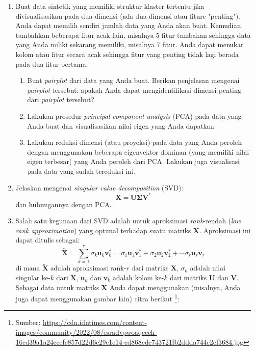 \documentclass[a4paper,11pt]{article} %
\begin{document}
\begin{enumerate}
%
%
\item Buat data sintetik yang memiliki struktur klaster tertentu
jika divisualisasikan pada dua dimensi (ada dua dimensi atau fiture "penting").
Anda dapat memilih sendiri jumlah data yang Anda akan buat.
Kemudian tambahkan beberapa fitur acak lain, misalnya 5 fitur tambahan sehingga
data yang Anda miliki sekarang memiliki, misalnya 7 fitur. Anda dapat menukar
kolom atau fitur secara acak sehingga fitur yang penting tidak lagi berada
pada dua fitur pertama.
  \begin{enumerate}
    \item Buat \textit{pairplot} dari data yang Anda buat. Berikan penjelasan
    mengenai \textit{pairplot} tersebut: apakah Anda dapat mengidentifikasi
    dimensi penting dari \textit{pairplot} tersebut?
    \item Lakukan prosedur \textit{principal component analysis} (PCA) pada
    data yang Anda buat dan visualisasikan nilai eigen yang Anda dapatkan
    \item Lakukan reduksi dimensi (atau proyeksi) pada data yang Anda peroleh
    dengan menggunakan beberapa eigenvektor dominan (yang memiliki
    nilai eigen terbesar) yang Anda peroleh dari PCA. Lakukan juga visualisasi
    pada data yang sudah tereduksi ini.
  \end{enumerate}
%
%
\item Jelaskan mengenai \textit{singular value decomposition} (SVD):
\begin{equation*}
\mathbf{X} = \mathbf{U}\mathbf{\Sigma}\mathbf{V}^{*}
\end{equation*}
dan hubungannya dengan PCA.
%
%
\item Salah satu kegunaan dari SVD adalah untuk aproksimasi
\textit{rank}-rendah (\textit{low rank approximation}) yang
optimal terhadap suatu matriks $\mathbf{X}$. Aproksimasi ini
dapat ditulis sebagai:
\begin{equation}
\tilde{\mathbf{X}} = \sum_{k=1}^{r} \sigma_{k} \mathbf{u}_{k} \mathbf{v}^{*}_{k}
= \sigma_{1} \mathbf{u}_{1} \mathbf{v}^{*}_{1} +
\sigma_{2} \mathbf{u}_{2} \mathbf{v}^{*}_{2} + \cdots
\sigma_{r} \mathbf{u}_{r} \mathbf{v}_{r}
\label{eq:svd02}
\end{equation}
di mana $\tilde{\mathbf{X}}$ adalah aproksimasi rank-$r$ dari matriks
$\mathbf{X}$, $\sigma_{k}$ adalah nilai singular ke-$k$ dari $\mathbf{X}$,
$\mathbf{u}_{k}$ dan $\mathbf{v}_{k}$ adalah kolom
ke-$k$ dari matriks $\mathbf{U}$ dan $\mathbf{V}$.
%
Sebagai data untuk matriks $\mathbf{X}$ Anda dapat menggunakan (misalnya, Anda juga dapat
menggunakan gambar lain)
citra berikut \footnote{Sumber:
\url{https://cdn.idntimes.com/content-images/community/2022/08/esradvpwoaqeech-16ed39a1a24ecefe857d22d6e29c1e14-cd868cde743721fb2ddda744c2ef3684.jpg}}:


\end{enumerate}
\end{document}
